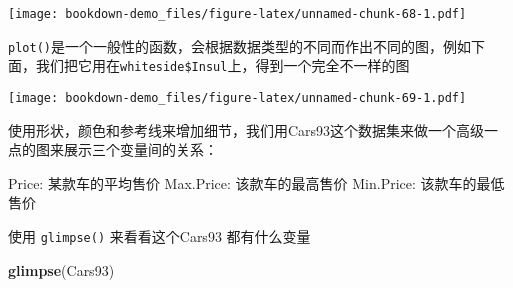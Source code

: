 \documentclass[]{book}
\newenvironment{Shaded}{\begin{snugshade}}{\end{snugshade}}
\newcommand{\DataTypeTok}[1]{\textcolor[rgb]{0.13,0.29,0.53}{#1}}
\newcommand{\KeywordTok}[1]{\textcolor[rgb]{0.13,0.29,0.53}{\textbf{#1}}}
\newcommand{\NormalTok}[1]{#1}
\newcommand{\OperatorTok}[1]{\textcolor[rgb]{0.81,0.36,0.00}{\textbf{#1}}}
\newcommand{\StringTok}[1]{\textcolor[rgb]{0.31,0.60,0.02}{#1}}
\begin{document}
\begin{Shaded}
\end{Shaded}

\texttt{[image: bookdown-demo\_files/figure-latex/unnamed-chunk-68-1.pdf]}

\texttt{plot()}是一个一般性的函数，会根据数据类型的不同而作出不同的图，例如下面，我们把它用在\texttt{whiteside\$Insul}上，得到一个完全不一样的图

\begin{Shaded}
\end{Shaded}

\texttt{[image: bookdown-demo\_files/figure-latex/unnamed-chunk-69-1.pdf]}

使用形状，颜色和参考线来增加细节，我们用Cars93这个数据集来做一个高级一点的图来展示三个变量间的关系：

Price: 某款车的平均售价 Max.Price: 该款车的最高售价 Min.Price:
该款车的最低售价

使用 \texttt{glimpse()} 来看看这个Cars93 都有什么变量

\begin{Shaded}
\begin{Highlighting}[]
\KeywordTok{glimpse}\NormalTok{(Cars93)}
\end{Highlighting}
\end{Shaded}
\end{document}
